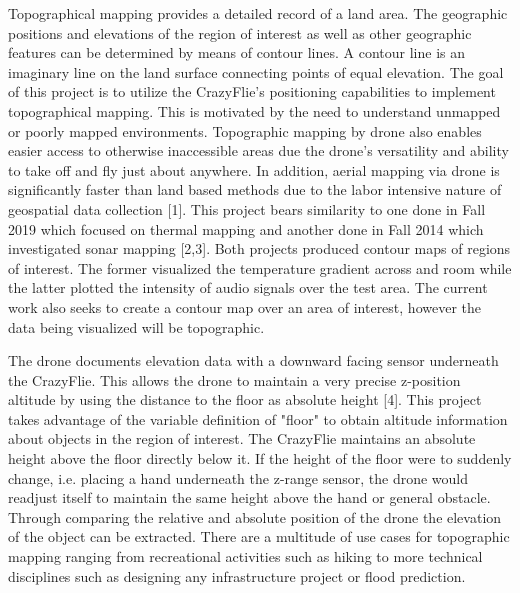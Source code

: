 
Topographical mapping provides a detailed record of a land area. The geographic positions and elevations of the region of interest as well as other geographic features can be determined by means of contour lines. A contour line is an imaginary line on the land surface connecting points of equal elevation. The goal of this project is to utilize the CrazyFlie's positioning capabilities to implement topographical mapping. This is motivated by the need to understand unmapped or poorly mapped environments. Topographic mapping by drone also enables easier access to otherwise inaccessible areas due the drone's versatility and ability to take off and fly just about anywhere. In addition, aerial mapping via drone is significantly faster than land based methods due to the labor intensive nature of geospatial data collection [1]. This project bears similarity to one done in Fall 2019 which focused on thermal mapping and another done in Fall 2014 which investigated sonar mapping [2,3]. Both projects produced contour maps of regions of interest. The former visualized the temperature gradient across and room while the latter plotted the intensity of audio signals over the test area. The current work also seeks to create a contour map over an area of interest, however the data being visualized will be topographic. 

The drone documents elevation data with a downward facing sensor underneath the CrazyFlie. This allows the drone to maintain a very precise z-position altitude by using the distance to the floor as absolute height [4]. This project takes advantage of the variable definition of "floor" to obtain altitude information about objects in the region of interest. The CrazyFlie maintains an absolute height above the floor directly below it. If the height of the floor were to suddenly change, i.e. placing a hand underneath the z-range sensor, the drone would readjust itself to maintain the same height above the hand or general obstacle. Through comparing the relative and absolute position of the drone the elevation of the object can be extracted. There are a multitude of use cases for topographic mapping ranging from recreational activities such as hiking to more technical disciplines such as designing any infrastructure project or flood prediction. 

